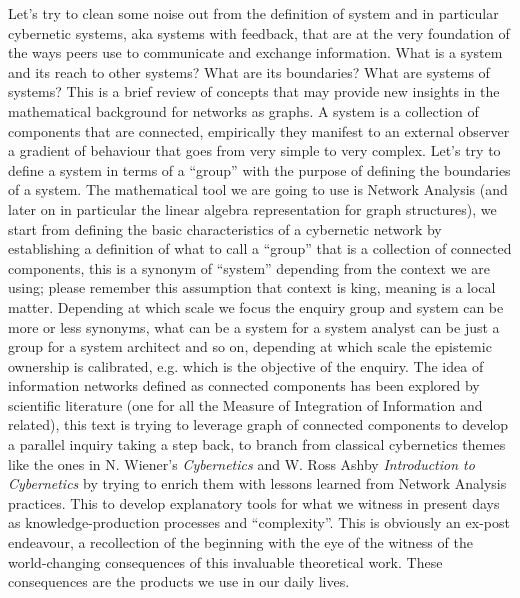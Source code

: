 \documentclass[14pt]{extarticle}
\begin{document}
\hspace*{15mm}Let’s try to clean some noise out from the definition of system and in particular cybernetic systems, aka systems with feedback, that are at the very foundation of the ways peers use to communicate and exchange information. What is a system and its reach to other systems? What are its boundaries? What are systems of systems? This is a brief review of concepts that may provide new insights in the mathematical background for networks as graphs.
\newline
\hspace*{15mm}A system is a collection of components that are connected, empirically they manifest to an external observer a gradient of behaviour that goes from very simple to very complex. Let’s try to define a system in terms of a “group” with the purpose of defining the boundaries of a system. The mathematical tool we are going to use is Network Analysis (and later on in particular the linear algebra representation for graph structures), we start from defining the basic characteristics of a cybernetic network by establishing a definition of what to call a “group” that is a collection of connected components, this is a synonym of “system” depending from the context we are using; please remember this assumption that context is king, meaning is a local matter. Depending at which scale we focus the enquiry group and system can be more or less synonyms, what can be a system for a system analyst can be just a group for a system architect and so on, depending at which scale the epistemic ownership is calibrated, e.g. which is the objective of the enquiry.
\newline
The idea of information networks defined as connected components has been explored by scientific literature (one for all the Measure of Integration of Information \cite{TONONIintegrated} and related), this text is trying to leverage graph of connected components to develop a parallel inquiry taking a step back, to branch from classical cybernetics themes like the ones in N. Wiener's \textit{Cybernetics} and W. Ross Ashby \textit{Introduction to Cybernetics} by trying to enrich them with lessons learned from Network Analysis practices. This to develop explanatory tools for what we witness in present days as knowledge-production processes and “complexity”. This is obviously an ex-post endeavour, a recollection of the beginning with the eye of the witness of the world-changing consequences of this invaluable theoretical work. These consequences are the products we use in our daily lives.
\end{document}
